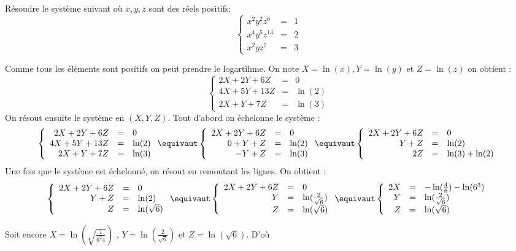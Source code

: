 



\begin{exercice}
Résoudre le système suivant où $x,y,z$ sont des réels positifs: 
$$\left\{ \begin{array}{ccc}
x^2y^2z^6 & =& 1\\
x^4y^5z^{13}& =& 2 \\
x^2yz^7 & =& 3
\end{array}\right. $$
\end{exercice}

\begin{correction}
Comme tous les éléments sont positifs on peut prendre le logartihme. 
On note $X= \ln(x), Y=\ln(y)$ et $Z=\ln(z)$ on obtient : 
$$\left\{ \begin{array}{ccc}
2X +2Y+6Z& =& 0\\
4X+5Y+13Z& =& \ln(2) \\
2X+Y+7Z & =& \ln(3)
\end{array}\right. $$
On résout ensuite le système en $(X,Y,Z)$. Tout d'abord on échelonne le système : 
$$\left\{ \begin{array}{rcl}
2X +2Y+6Z& =& 0\\
4X+5Y+13Z& =& \ln(2) \\
2X+Y+7Z & =& \ln(3)
\end{array}\right. \equivaut 
\left\{ \begin{array}{rcl}
2X +2Y+6Z& =& 0\\
0+Y+Z& =& \ln(2) \\
-Y+Z & =& \ln(3)
\end{array}\right. \equivaut 
\left\{ \begin{array}{rcl}
2X +2Y+6Z& =& 0\\
Y+Z& =& \ln(2) \\
2 Z & =& \ln(3) +\ln(2)
\end{array}\right.$$
Une fois que le système est échelonné, on résout en remontant les lignes. 
On obtient : 
$$\left\{ \begin{array}{rcl}
2X +2Y+6Z& =& 0\\
Y+Z& =& \ln(2) \\
Z & =& \ln(\sqrt{6})
\end{array}\right. \equivaut 
\left\{ \begin{array}{rcl}
2X +2Y+6Z& =& 0\\
Y& =& \ln(\frac{2}{\sqrt{6}}) \\
Z & =& \ln(\sqrt{6})
\end{array}\right. \equivaut 
\left\{ \begin{array}{rcl}
2X & =& -\ln(\frac{4}{6})  -\ln(6^3)\\
Y& =& \ln(\frac{2}{\sqrt{6}}) \\
Z & =& \ln(\sqrt{6})
\end{array}\right.
$$


Soit encore  $X= \ln( \sqrt{\frac{1}{6^2 4}}) $ , $Y = \ln(\frac{2}{\sqrt{6}}) $ et $Z= \ln(\sqrt{6})$. 
D'où 

\end{correction}